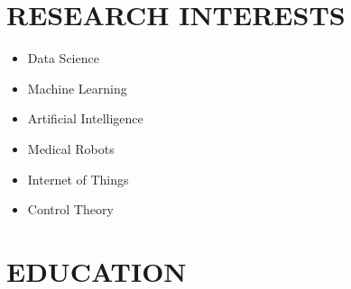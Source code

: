 \documentclass[10pt,a4paper,sans]{moderncv} %
\begin{document}
	
	\makecvtitle
	
	
	\vspace{-2.5 em}
	\section{RESEARCH INTERESTS}
	\begin{multicols}{3}
    	\begin{itemize}
    	    \centering
    	    \item Data Science
    	    \item Machine Learning
    		\item Artificial Intelligence
    		\item Medical Robots
    		\item Internet of Things
    		\item Control Theory
    	\end{itemize}
	\end{multicols}
	
	\section{EDUCATION}
	
\end{document}
